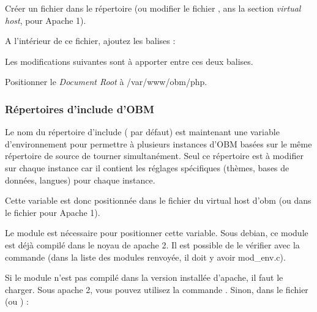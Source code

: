 Créer un fichier  dans le répertoire 
(ou modifier le fichier , ans la section \emph{virtual host}, pour 
Apache 1).

A l'intérieur de ce fichier, ajoutez les balises :


Les modifications suivantes sont à apporter entre ces deux balises.

Positionner le \emph{Document Root} à /var/www/obm/php.


\subsubsection*{Répertoires d'include d'OBM}

Le nom du répertoire d'include ( par défaut) est
maintenant une variable d'environnement pour permettre à plusieurs
instances d'OBM basées sur le même répertoire de source de tourner
simultanément. Seul ce répertoire est à modifier sur chaque instance
car il contient les réglages spécifiques (thèmes, bases de données,
langues) pour chaque instance.

Cette variable est donc positionnée dans le fichier du virtual host
d'obm  (ou dans le fichier 
pour Apache 1).

Le module  est nécessaire pour positionner cette variable.
Sous debian, ce module est déjà compilé dans le noyau de apache 2. Il est
possible de le vérifier avec la commande  (dans la
liste des modules renvoyée, il doit y avoir mod\_env.c).

Si le module  n'est pas compilé dans la version installée
d'apache, il faut le charger. Sous apache 2, vous pouvez utilisez la commande
. Sinon, dans le fichier  (ou
) :

